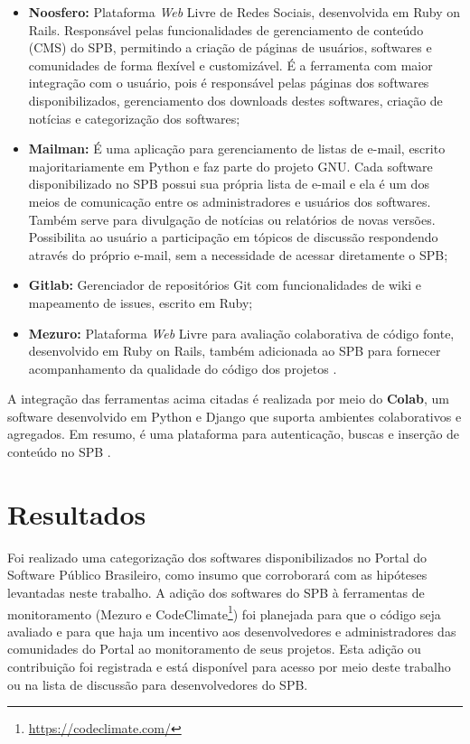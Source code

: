 \begin{itemize}
  \item \textbf{Noosfero:} Plataforma \textit{Web} Livre de Redes Sociais, desenvolvida
	em Ruby on Rails. Responsável pelas funcionalidades de gerenciamento de
	conteúdo (CMS) do SPB, permitindo a criação de páginas de usuários, softwares
	e comunidades de forma flexível e customizável. É a ferramenta com maior
	integração com o usuário, pois é responsável pelas páginas dos softwares
	disponibilizados, gerenciamento dos downloads destes softwares, criação de
	notícias e categorização dos softwares;
  \item \textbf{Mailman:} É uma aplicação para gerenciamento de listas de
	e-mail, escrito majoritariamente em Python e faz parte do projeto GNU. Cada
	software disponibilizado no SPB possui sua própria lista de e-mail e ela é um
	dos meios de comunicação entre os administradores e usuários dos softwares.
	Também serve para divulgação de notícias ou relatórios de novas versões.
	Possibilita ao usuário a participação em tópicos de discussão respondendo
	através do próprio e-mail, sem a necessidade de acessar diretamente o SPB;
	\item \textbf{Gitlab:} Gerenciador de repositórios Git com funcionalidades de
	wiki e mapeamento de issues, escrito em Ruby;
	\item \textbf{Mezuro:} Plataforma \textit{Web} Livre para avaliação colaborativa de
	código fonte, desenvolvido em Ruby on Rails, também adicionada ao SPB para
	fornecer acompanhamento da qualidade do código dos projetos \cite{aboutSPB}.
\end{itemize}

A integração das ferramentas acima citadas é realizada por meio do
\textbf{Colab}, um software desenvolvido em Python e Django que suporta
ambientes colaborativos e agregados. Em resumo, é uma plataforma para
autenticação, buscas e inserção de conteúdo no SPB \cite{aboutSPB}.


\section{Resultados}

Foi realizado uma categorização dos softwares disponibilizados no Portal do
Software Público Brasileiro, como insumo que corroborará com as hipóteses
levantadas neste trabalho. A adição dos softwares do SPB à ferramentas de
monitoramento (Mezuro e CodeClimate\footnote{\url{https://codeclimate.com/}})
foi planejada para que o código seja avaliado e para que haja um incentivo aos
desenvolvedores e administradores das comunidades do Portal ao monitoramento de
seus projetos. Esta adição ou contribuição foi registrada e está disponível
para acesso por meio deste trabalho ou na lista de discussão para
desenvolvedores do SPB.

